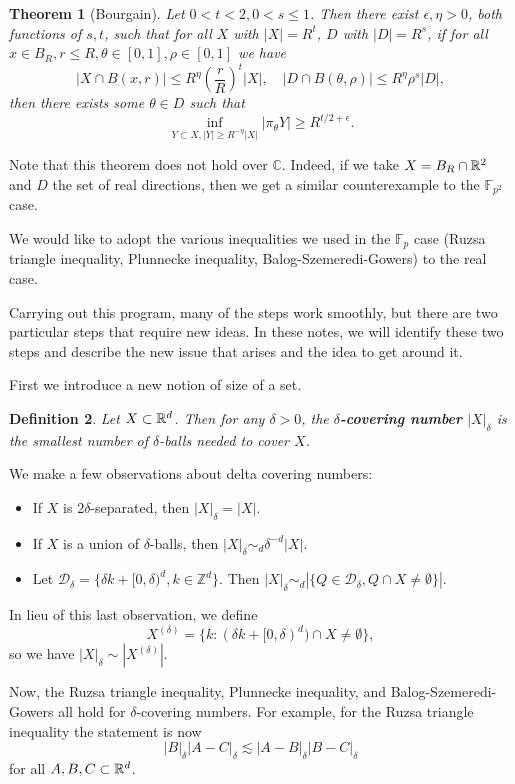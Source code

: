 \documentclass[12pt]{amsart}
\newtheorem{theorem}{Theorem}[section]
\newtheorem{Definition}[theorem]{Definition}
\newcommand{\F}{\mathbb{F}}
\newcommand{\CC}{\mathbb{C}}
\newcommand{\eps}{\epsilon}
\newcommand{\Z}{\mathbb{Z}}
\begin{document}
\begin{theorem}[Bourgain]
    Let $0<t<2,0<s\leq 1$. Then there exist $\eps,\eta>0$, both functions of $s,t$, such that for all $X$ with $|X|=R^t$, $D$ with $|D|=R^s$, if for all $x\in B_R,r\leq R,\theta\in[0,1],\rho\in[0,1]$ we have
    $$|X\cap B(x,r)|\leq R^\eta\left(\frac{r}{R}\right)^t|X|,\quad|D\cap B(\theta,\rho)|\leq R^\eta\rho^s|D|,$$
    then there exists some $\theta\in D$ such that
    $$\inf_{Y\subset X,|Y|\geq R^{-\eta}|X|}|\pi_\theta Y|\geq R^{t/2+\eps}.$$
\end{theorem}

Note that this theorem does not hold over $\CC$. Indeed, if we take $X=B_R\cap\mathbb{R}^2$ and $D$ the set of real directions, then we get a similar counterexample to the $\F_{p^2}$ case.

We would like to adopt the various inequalities we used in the $\F_p$ case (Ruzsa triangle inequality, Plunnecke inequality, Balog-Szemeredi-Gowers) to the real case. 

Carrying out this program,  many of the steps work smoothly,  but there are two particular steps that require new ideas.   In these notes,  we will identify these two steps and describe the new issue that arises and the idea to get around it.

First we introduce a new notion of size of a set.

\begin{Definition}
    Let $X\subset\mathbb{R}^d$. Then for any $\delta>0$, the \textbf{$\delta$-covering number} $|X|_\delta$ is the smallest number of $\delta$-balls needed to cover $X$.
\end{Definition}

We make a few observations about delta covering numbers:

\begin{itemize}
    \item If $X$ is $2\delta$-separated, then $|X|_\delta=|X|$.
    \item If $X$ is a union of $\delta$-balls, then $|X|_\delta\sim_d\delta^{-d}|X|$.
    \item Let $\mathcal{D}_\delta=\{\delta k+[0,\delta)^d,k\in\Z^d\}$. Then $|X|_\delta\sim_d|\{Q\in\mathcal{D}_\delta,Q\cap X\neq\emptyset\}|$.
\end{itemize}

In lieu of this last observation, we define
$$X^{(\delta)}=\{k:(\delta k+[0,\delta)^d)\cap X\neq\emptyset\},$$
so we have $|X|_\delta\sim|X^{(\delta)}|$. 

Now, the Ruzsa triangle inequality, Plunnecke inequality, and Balog-Szemeredi-Gowers all hold for $\delta$-covering numbers. For example, for the Ruzsa triangle inequality the statement is now
$$|B|_\delta|A-C|_\delta\lesssim|A-B|_\delta|B-C|_\delta$$
for all $A,B,C\subset\mathbb{R}^d$. 
\end{document}
